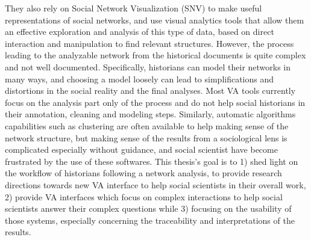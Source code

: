 They also rely on Social Network Visualization (SNV) to make useful representations of social networks, and use visual analytics tools that allow them an effective exploration and analysis of this type of data, based on direct interaction and manipulation to find relevant structures.
However, the process leading to the analyzable network from the historical documents is quite complex and not well documented.
Specifically, historians can model their networks in many ways, and choosing a model loosely can lead to simplifications and distortions in the social reality and the final analyses.
Most VA tools currently focus on the analysis part only of the process and do not help social historians in their annotation, cleaning and modeling steps.
Similarly, automatic algorithms capabilities such as clustering are often available to help making sense of the network structure, but making sense of the results from a sociological lens is complicated especially without guidance, and social scientist have become frustrated by the use of these softwares.
This thesis's goal is to 1) shed light on the workflow of historians following a network analysis, to provide research directions towards new VA interface to help social scientists in their overall work, 2) provide VA interfaces which focus on complex interactions to help social scientists answer their complex questions while 3) focusing on the usability of those systems, especially concerning the traceability and interpretations of the results.




